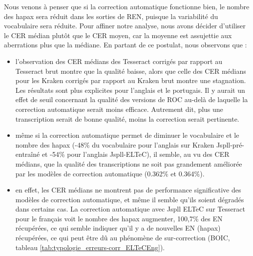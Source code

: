 Nous venons à penser que si la correction automatique fonctionne bien, le nombre des hapax sera réduit dans les sorties de REN, puisque la variabilité du vocabulaire sera réduite. Pour affiner notre analyse, nous avons décider d'utiliser le CER médian plutôt que le CER moyen, car la moyenne est assujettie aux aberrations plus que la médiane. En partant de ce postulat, nous observons que :
\begin{itemize}
\item l'observation des CER médians des Tesseract corrigés par rapport au Tesseract brut montre que la qualité baisse, alors que celle des CER médians pour les Kraken corrigés par rapport au Kraken brut montre une stagnation. Les résultats sont plus explicites pour l'anglais et le portugais. Il y aurait un effet de seuil concernant la qualité des versions de ROC au-delà de laquelle la correction automatique serait moins efficace. Autrement dit, plus une transcription serait de bonne qualité, moins la correction serait pertinente.
\item même si la correction automatique permet de diminuer le vocabulaire et le nombre des hapax (-48\% du vocabulaire pour l'anglais sur Kraken Jspll-pré-entraîné et -54\% pour l'anglais Jspll-ELTeC), il semble, au vu des CER médians, que la qualité des transcriptions ne soit pas grandement améliorée par les modèles de correction automatique (0.362\% et 0.364\%). 
\item en effet, les CER médians ne montrent pas de performance significative des modèles de correction automatique, et même il semble qu'ils soient dégradés dans certains cas. La correction automatique avec Jspll ELTeC sur Tesseract pour le français voit le nombre des hapax augmenter, 100,7\% des EN récupérées, ce qui semble indiquer qu'il y a de nouvelles EN (hapax) récupérées, ce qui peut être dû au phénomène de sur-correction (BOIC, tableau \ref{tab:typologie_erreurs-corr_ELTeCEng}).
\end{itemize}
 
